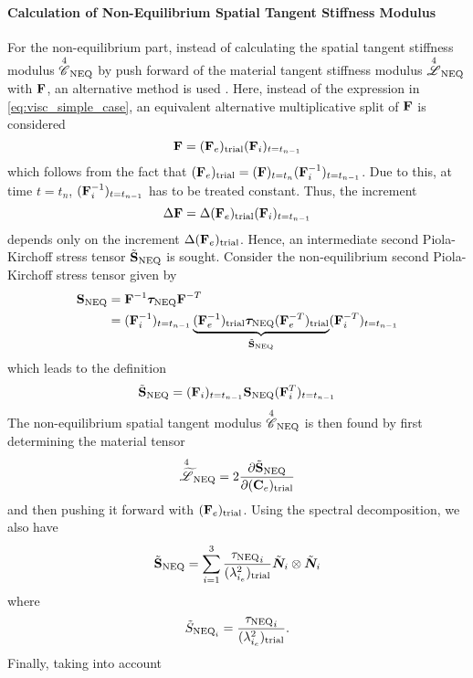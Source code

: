 \paragraph*{Calculation of Non-Equilibrium Spatial Tangent Stiffness Modulus}
For the non-equilibrium part, instead of calculating the spatial tangent stiffness modulus \({\overset{4}{\mathscr{C}}}_{\text{NEQ}}\) by push forward of the material tangent stiffness modulus \({\overset{4}{\mathscr{L}}}_{\text{NEQ}}\) with \(\mathbf{F}\),  an alternative method is used \cite{Reese1998Sep}. Here, instead of the expression in \cref{eq:visc_simple_case}, an equivalent alternative multiplicative split of \(\mathbf{F}\) is considered
\begin{equation}
    \mathbf{F} = ({\mathbf{F}_{e}})_\text{trial} (\mathbf{F}_{i})_{t=t_{n-1}}
\end{equation}
which follows from the fact that \(({\mathbf{F}_{e}})_\text{trial} = (\mathbf{F})_{t=t_{n}} (\mathbf{F}_{i}^{-1})_{t=t_{n-1}}\). Due to this, at time \(t = t_{n}\), \((\mathbf{F}_{i}^{-1})_{t=t_{n-1}}\) has to be treated constant. Thus, the increment
\begin{equation}
    \Delta \mathbf{F} = \Delta ({\mathbf{F}_{e}})_\text{trial} (\mathbf{F}_{i})_{t=t_{n-1}}
\end{equation}
depends only on the increment \(\Delta ({\mathbf{F}_{e}})_\text{trial}\). Hence, an intermediate second Piola-Kirchoff stress tensor \(\tilde{\mathbf{S}}_{\text{NEQ}}\) is sought. Consider the non-equilibrium second Piola-Kirchoff stress tensor given by
\begin{align}
    \nonumber \mathbf{S}_{\text{NEQ}} &= \mathbf{F}^{-1} \bm{\tau}_{\text{NEQ}} \mathbf{F}^{-T} \\
    &=  (\mathbf{F}_{i}^{-1})_{t=t_{n-1}} \underbrace{({\mathbf{F}_{e}^{-1}})_\text{trial} \bm{\tau}_{\text{NEQ}} ({\mathbf{F}_{e}^{-T}})_\text{trial}}_{\tilde{\mathbf{S}}_{\text{NEQ}}} (\mathbf{F}_{i}^{-T})_{t=t_{n-1}} 
\end{align}
which leads to the definition
\begin{equation}
    \tilde{\mathbf{S}}_{\text{NEQ}} = (\mathbf{F}_{i})_{t=t_{n-1}} \mathbf{S}_{\text{NEQ}} (\mathbf{F}_{i}^{T})_{t=t_{n-1}}
\end{equation}
The non-equilibrium spatial tangent modulus \({\overset{4}{\mathscr{C}}}_{\text{NEQ}}\) is then found by first determining the material tensor
\begin{equation}
    {\overset{4}{\widetilde{\mathscr{L}}}}_{\text{NEQ}} = 2 \pdv{\tilde{\mathbf{S}}_{\text{NEQ}}}{({\mathbf{C}_{e}})_\text{trial}}
\end{equation}
and then pushing it forward with \(({\mathbf{F}_{e}})_\text{trial}\). Using the spectral decomposition, we also have 
\begin{equation}
    \tilde{\mathbf{S}}_{\text{NEQ}} = \sum_{i=1}^{3} \frac{{{\tau}_{\text{NEQ}}}_{i}}{({\lambda^{2}_{{i}_e}})_\text{trial}} \tilde{\bm{N}}_{i} \otimes \tilde{\bm{N}}_{i}
\end{equation}
where 
\begin{equation}
    \tilde{S}_{\text{NEQ}_{i}} = \frac{{{\tau}_{\text{NEQ}}}_{i}}{({\lambda^{2}_{{i}_e}})_\text{trial}}.
\end{equation}
Finally, taking into account
